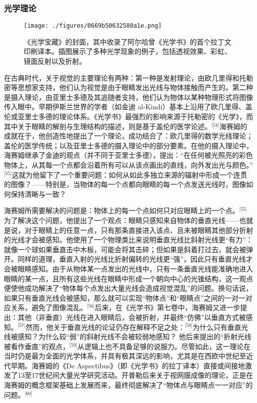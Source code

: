 \subsubsection{光学理论}
\begin{figure}[ht]
\centering
\texttt{[image: ./figures/0669b50632580a1e.png]}
\caption{《光学宝藏》的封面，其中收录了阿尔哈曾《光学书》的首个拉丁文印刷译本。插图展示了多种光学现象的例子，包括透视效果、彩虹、镜面反射以及折射。} \label{fig_YBH_1}
\end{figure}
在古典时代，关于视觉的主要理论有两种：第一种是发射理论，由欧几里得和托勒密等思想家支持，他们认为视觉是由于眼睛发出光线与物体接触而产生的。第二种是摄入理论，由亚里士多德及其追随者支持，他们认为物体以某种物理形式将图像传入眼中。早期伊斯兰世界的学者（如金迪 al-Kindi）基本上沿用了欧几里得、盖伦或亚里士多德的理论体系。《光学书》最强烈的影响来源于托勒密的《光学》，而其中关于眼睛的解剖与生理结构的描述，则是基于盖伦的医学论述。\(^\text{[54]}\)海赛姆的成就在于，他创造性地提出了一个理论，成功结合了：欧几里得的数学光线理论；盖伦的医学传统；以及亚里士多德的摄入理论中的部分要素。在他的摄入理论中，海赛姆继承了金迪的观点（并不同于亚里士多德），提出：“在任何被光照亮的彩色物体上，从其每一个点都会沿着所有可以从该点画出的直线，向外发出光与颜色。”\(^\text{[55]}\)这就为他留下了一个重要问题：如何从如此多独立来源的辐射中形成一个连贯的图像？——特别是，当物体的每一个点都向眼睛的每一个点发送光线时，图像如何保持清晰与一致？

海赛姆所需要解决的问题是：物体上的每一个点如何只对应眼睛上的一个点。\(^\text{[55]}\)为了解决这个问题，他提出了一个观点：眼睛只感知来自物体的垂直光线——也就是说，对于眼睛上的任意一点，只有那条直接进入该点、且未被眼睛其他部分折射的光线才会被感知。他使用了一个物理类比来说明垂直光线比斜射光线更“有力”：就像一个球如果垂直击中木板，可能会将其击碎；但如果是斜着打过去，就会被弹开。同样的道理，垂直入射的光线比折射偏转的光线更“强”，因此只有垂直光线才会被眼睛感知。由于从物体某一点发出的光线中，只有一条垂直光线能准确地进入眼睛的某一点，且所有这些光线在眼睛中形成一个朝向中心的光锥结构，这一观点便使他成功解决了“物体每个点发出大量光线会造成视觉混乱”的问题。换句话说，如果只有垂直光线会被感知，那么就可以实现“物体点”和“眼睛点”之间的一对一对应关系，避免了图像混乱。\(^\text{[56]}\)后来，在《光学书》第七卷中，海赛姆又进一步提出：其他（非垂直）光线在进入眼睛后，会被折射，并最终“仿佛”以垂直方式被感知。\(^\text{[57]}\)然而，他关于垂直光线的论证仍存在解释不足之处：\(^\text{[58]}\)为什么只有垂直光线被感知？为什么较“弱”的斜射光线不会被较弱地感知？
他后来提出的“折射光线被看作垂直”的观点，\(^\text{[59]}\)从逻辑上也不具备足够的说服力。尽管如此，这一理论在当时仍是最为全面的光学体系，并具有极其深远的影响，尤其是在西欧中世纪至近代早期。海赛姆的《De Aspectibus》（即《光学书》的拉丁译本）直接或间接地激发了13至17世纪间大量光学研究活动。开普勒后来关于视网膜成像的理论，正是在海赛姆的概念框架基础上发展而来，最终彻底解决了“物体点与眼睛点一一对应”的问题。\(^\text{[60]}\)

